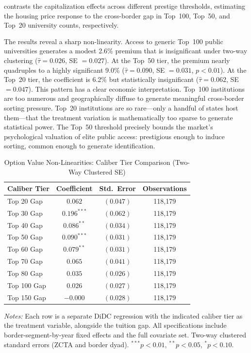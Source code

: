 \documentclass[12pt]{article}
\begin{document}
 contrasts the capitalization effects across different prestige thresholds, estimating the housing price response to the cross-border gap in Top~100, Top~50, and Top~20 university counts, respectively.

The results reveal a sharp non-linearity. Access to generic Top~100 public universities generates a modest 2.6\% premium that is insignificant under two-way clustering ($\hat{\tau} = 0.026$, SE $= 0.027$). At the Top~50 tier, the premium nearly quadruples to a highly significant 9.0\% ($\hat{\tau} = 0.090$, SE $= 0.031$, $p < 0.01$). At the Top~20 tier, the coefficient is 6.2\% but statistically insignificant ($\hat{\tau} = 0.062$, SE $= 0.047$). This pattern has a clear economic interpretation. Top~100 institutions are too numerous and geographically diffuse to generate meaningful cross-border sorting pressure. Top~20 institutions are so rare---only a handful of states host them---that the treatment variation is mathematically too sparse to generate statistical power. The Top~50 threshold precisely bounds the market's psychological valuation of elite public access: prestigious enough to induce sorting, common enough to generate identification.

\begin{table}[t]
\begin{threeparttable}
\caption{Option Value Non-Linearities: Caliber Tier Comparison (Two-Way Clustered SE)}\label{tab:het_tiers}
\begin{tabular}{lccc}
\toprule
\textbf{Caliber Tier} & \textbf{Coefficient} & \textbf{Std.\ Error} & \textbf{Observations} \\
\midrule
Top 20 Gap & $0.062$ & $(0.047)$ & 118,179 \\
Top 30 Gap & $0.196^{***}$ & $(0.062)$ & 118,179 \\
Top 40 Gap & $0.086^{**}$ & $(0.034)$ & 118,179 \\
Top 50 Gap & $0.090^{***}$ & $(0.031)$ & 118,179 \\
Top 60 Gap & $0.079^{**}$ & $(0.031)$ & 118,179 \\
Top 70 Gap & $0.065$ & $(0.041)$ & 118,179 \\
Top 80 Gap & $0.035$ & $(0.026)$ & 118,179 \\
Top 100 Gap & $0.026$ & $(0.027)$ & 118,179 \\
Top 150 Gap & $-0.000$ & $(0.028)$ & 118,179 \\
\bottomrule
\end{tabular}
\begin{tablenotes}\small
\item \textit{Notes:} Each row is a separate DiDC regression with the indicated caliber tier as the treatment variable, alongside the tuition gap. All specifications include border-segment-by-year fixed effects and the full covariate set. Two-way clustered standard errors (ZCTA and border dyad). $^{***}p<0.01$, $^{**}p<0.05$, $^{*}p<0.10$.
\end{tablenotes}
\end{threeparttable}
\end{table}
\end{document}
